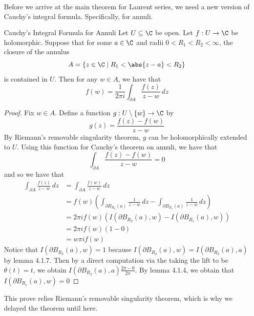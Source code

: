\documentclass[a4paper]{article}
\begin{document}
Before we arrive at the main theorem for Laurent series, we need a new version of Cauchy's integral formula. Specifically, for annuli. 

\begin{thm}{Cauchy's Integral Formula for Annuli}{} Let $U\subseteq\C$ be open. Let $f:U\to\C$ be holomorphic. Suppose that for some $a\in\C$ and radii $0<R_1<R_2<\infty$, the closure of the annulus $$A=\{z\in\C\;|\; R_1<\abs{z-a}<R_2\}$$ is contained in $U$. Then for any $w\in A$, we have that $$f(w)=\frac{1}{2\pi i}\int_{\partial A}\frac{f(z)}{z-w}\,dz$$ 
\begin{proof}
Fix $w\in A$. Define a function $g:U\setminus\{w\}\to\C$ by $$g(z)=\frac{f(z)-f(w)}{z-w}$$ By Riemann's removable singularity theorem, $g$ can be holomorphically extended to $U$. Using this function for Cauchy's theorem on annuli, we have that $$\int_{\partial A}\frac{f(z)-f(w)}{z-w}=0$$ and so we have that 
\begin{align*}
\int_{\partial A}\frac{f(z)}{z-w}\,dz&=\int_{\partial A}\frac{f(w)}{z-w}\,dz\\
&=f(w)\left(\int_{\partial B_{R_2}(a)}\frac{1}{z-w}\,dz-\int_{\partial B_{R_1}(a)}\frac{1}{z-w}\,dz\right)\\
&=2\pi if(w)\left(I(\partial B_{R_2}(a),w)-I(\partial B_{R_1}(a),w)\right)\\
&=2\pi if(w)(1-0)\\
&=w\pi i f(w)
\end{align*}
Notice that $I(\partial B_{R_2}(a),w)=1$ because $I(\partial B_{R_2}(a),w)=I(\partial B_{R_2}(a),a)$ by lemma 4.1.7. Then by a direct computation via the taking the lift to be $\theta(t)=t$, we obtain $I(\partial B_{R_2}(a),a)\frac{2\pi-0}{2\pi}$. By lemma 4.1.4, we obtain that $I(\partial B_{R_1}(a),w)=0$
\end{proof}
\end{thm}

This prove relies Riemann's removable singularity theorem, which is why we delayed the theorem until here. 
\end{document}
